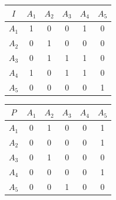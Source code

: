 \documentclass[a5paper,doc,10pt,noapacite]{apa6}
\begin{document}
{{\begin{table}[H]
   \fontsize{7}{11}\selectfont
    \begin{minipage}{.5\linewidth}
      \centering
	\begin{tabular}{c|ccccc} \thickline
	\(I\) & \(A_1\) & \(A_2\) & \(A_3\) & \(A_4\) & \(A_5\)  \\ \hline
    \(A_1\) & 1 & 0 & 0 & 1 & 0  \\
    \(A_2\) & 0 & 1 & 0 & 0 & 0  \\
	\(A_3\) & 0 & 1 & 1 & 1 & 0   \\
	\(A_4\) & 1 & 0 & 1 & 1 & 0   \\
	\(A_5\) & 0 & 0 & 0 & 0 & 1   \\
\end{tabular}
\label{tab:B4} 
    \end{minipage}%
    \begin{minipage}{.5\linewidth}
      \centering
	\begin{tabular}{c|ccccc} \thickline
	\(P\) & \(A_1\) & \(A_2\) & \(A_3\) & \(A_4\) & \(A_5\)  \\ \hline
    \(A_1\) & 0 & 1 & 0 & 0 & 1  \\
    \(A_2\) & 0 & 0 & 0 & 0 & 1  \\
	\(A_3\) & 0 & 1 & 0 & 0 & 0   \\
	\(A_4\) & 0 & 0 & 0 & 0 & 1   \\
	\(A_5\) & 0 & 0 & 1 & 0 & 0   \\
\end{tabular}
\label{tab:B5} 
    \end{minipage} 
\end{table}

%

}}
\end{document}

